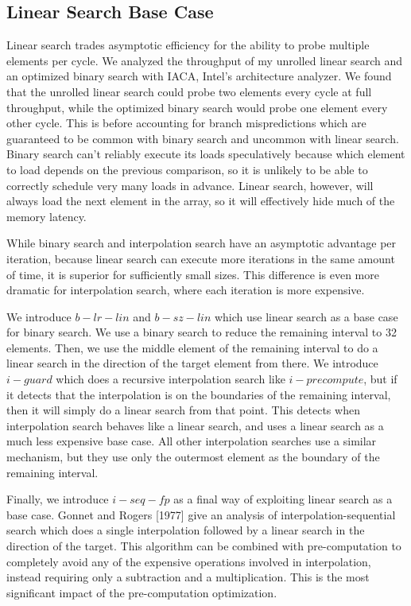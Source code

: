 \documentclass[twocolumn]{article}
\begin{document}
\subsection{Linear Search Base Case}
\label{linear}
Linear search trades asymptotic efficiency for the ability to probe multiple elements per cycle. We analyzed the throughput of my unrolled linear search and an optimized binary search with IACA, Intel's architecture analyzer. We found that the unrolled linear search could probe two elements every cycle at full throughput, while the optimized binary search would probe one element every other cycle. This is before accounting for branch mispredictions which are guaranteed to be common with binary search and uncommon with linear search. Binary search can't reliably execute its loads speculatively because which element to load depends on the previous comparison, so it is unlikely to be able to correctly schedule very many loads in advance. Linear search, however, will always load the next element in the array, so it will effectively hide much of the memory latency.

While binary search and interpolation search have an asymptotic advantage per iteration, because linear search can execute more iterations in the same amount of time, it is superior for sufficiently small sizes. This difference is even more dramatic for interpolation search, where each iteration is more expensive.

We introduce $b-lr-lin$ and $b-sz-lin$ which use linear search as a base case for binary search. We use a binary search to reduce the remaining interval to 32 elements. Then, we use the middle element of the remaining interval to do a linear search in the direction of the target element from there. We introduce $i-guard$ which does a recursive interpolation search like $i-precompute$, but if it detects that the interpolation is on the boundaries of the remaining interval, then it will simply do a linear search from that point. This detects when interpolation search behaves like a linear search, and uses a linear search as a much less expensive base case. All other interpolation searches use a similar mechanism, but they use only the outermost element as the boundary of the remaining interval.

Finally, we introduce $i-seq-fp$ as a final way of exploiting linear search as a base case. Gonnet and Rogers [1977] give an analysis of interpolation-sequential search which does a single interpolation followed by a linear search in the direction of the target. This algorithm can be combined with pre-computation to completely avoid any of the expensive operations involved in interpolation, instead requiring only a subtraction and a multiplication. This is the most significant impact of the pre-computation optimization.
\end{document}
